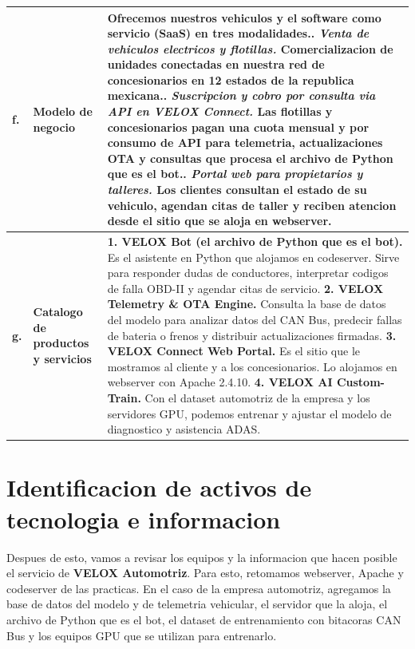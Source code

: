 \documentclass[letterpaper,11pt]{article}
\begin{document}
\begin{longtable}{|C{1.2cm}|L{3.6cm}|L{12.0cm}|}
\textbf{f.} & \textbf{Modelo de negocio} & Ofrecemos nuestros
vehiculos y el software como servicio (SaaS) en tres
modalidades.. \textit{Venta de vehiculos electricos y flotillas.}
Comercializacion de unidades conectadas en nuestra red de
concesionarios en 12 estados de la republica mexicana.. \textit{Suscripcion y cobro por consulta via API en VELOX
Connect.} Las flotillas y concesionarios pagan una cuota mensual y
por consumo de API para telemetria, actualizaciones OTA y consultas
que procesa el archivo de Python que es el bot.. \textit{Portal web para propietarios y talleres.} Los clientes
consultan el estado de su vehiculo, agendan citas de taller y
reciben atencion desde el sitio que se aloja en webserver. \\
\hline

\textbf{g.}
  & \textbf{Catalogo de productos y servicios}
  & \textbf{1. VELOX Bot (el archivo de Python que es el bot).} Es el
asistente en Python que alojamos en codeserver. Sirve para responder
dudas de conductores, interpretar codigos de falla OBD-II y agendar
citas de servicio.\newline
\textbf{2. VELOX Telemetry \& OTA Engine.} Consulta la base de datos
del modelo para analizar datos del CAN Bus, predecir fallas de
bateria o frenos y distribuir actualizaciones firmadas.\newline
\textbf{3. VELOX Connect Web Portal.} Es el sitio que le mostramos
al cliente y a los concesionarios. Lo alojamos en webserver con
Apache 2.4.10.\newline
\textbf{4. VELOX AI Custom-Train.} Con el dataset automotriz de la
empresa y los servidores GPU, podemos entrenar y ajustar el modelo
de diagnostico y asistencia ADAS. \\
\hline
\end{longtable}
\endgroup

\section{Identificacion de activos de tecnologia e informacion}

Despues de esto, vamos a revisar los equipos y la informacion que
hacen posible el servicio de \textbf{VELOX Automotriz}. Para esto,
retomamos webserver, Apache y codeserver de las practicas. En el
caso de la empresa automotriz, agregamos la base de datos del modelo
y de telemetria vehicular, el servidor que la aloja, el archivo de
Python que es el bot, el dataset de entrenamiento con bitacoras CAN
Bus y los equipos GPU que se utilizan para entrenarlo.
\end{document}
